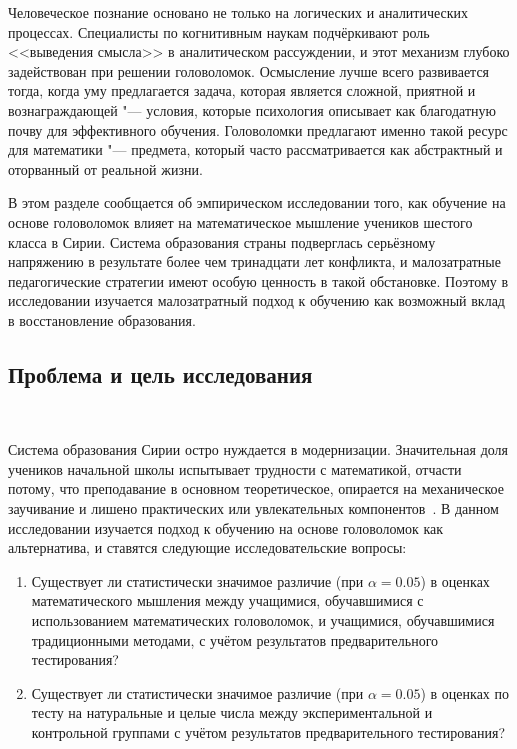 \documentclass[a4paper,14pt]{extreport}
\theoremstyle{plain}
\theoremstyle{definition}
\theoremstyle{remark}
\begin{document}
Человеческое познание основано не только на логических и аналитических процессах. Специалисты по когнитивным наукам подчёркивают роль <<выведения смысла>> в аналитическом рассуждении, и этот механизм глубоко задействован при решении головоломок. Осмысление лучше всего развивается тогда, когда уму предлагается задача, которая является сложной, приятной и вознаграждающей "--- условия, которые психология описывает как благодатную почву для эффективного обучения. Головоломки предлагают именно такой ресурс для математики "--- предмета, который часто рассматривается как абстрактный и оторванный от реальной жизни.

В этом разделе сообщается об эмпирическом исследовании того, как обучение на основе головоломок влияет на математическое мышление учеников шестого класса в Сирии. Система образования страны подверглась серьёзному напряжению в результате более чем тринадцати лет конфликта, и малозатратные педагогические стратегии имеют особую ценность в такой обстановке. Поэтому в исследовании изучается малозатратный подход к обучению как возможный вклад в восстановление образования.

\subsection*{Проблема и цель исследования}~\label{sec4.3.1}

Система образования Сирии остро нуждается в модернизации. Значительная доля учеников начальной школы испытывает трудности с математикой, отчасти потому, что преподавание в основном теоретическое, опирается на механическое заучивание и лишено практических или увлекательных компонентов~\cite{Duaa}. В данном исследовании изучается подход к обучению на основе головоломок как альтернатива, и ставятся следующие исследовательские вопросы:

\begin{enumerate}
	\item Существует ли статистически значимое различие (при $\alpha = 0.05$) в оценках математического мышления между учащимися, обучавшимися с использованием математических головоломок, и учащимися, обучавшимися традиционными методами, с учётом результатов предварительного тестирования?
	\item Существует ли статистически значимое различие (при $\alpha = 0.05$) в оценках по тесту на натуральные и целые числа между экспериментальной и контрольной группами с учётом результатов предварительного тестирования? 
\end{enumerate}
\end{document}
